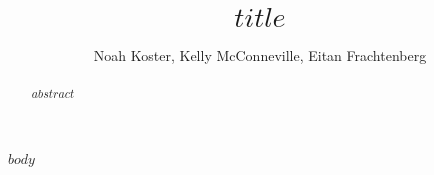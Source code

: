 \documentclass[12pt]{article}
\title{$title$}
\author{Noah Koster, Kelly McConneville, Eitan Frachtenberg}
\begin{document}
\maketitle

\begin{abstract}
  $abstract$
\end{abstract}

$body$


%
%
\end{document}
